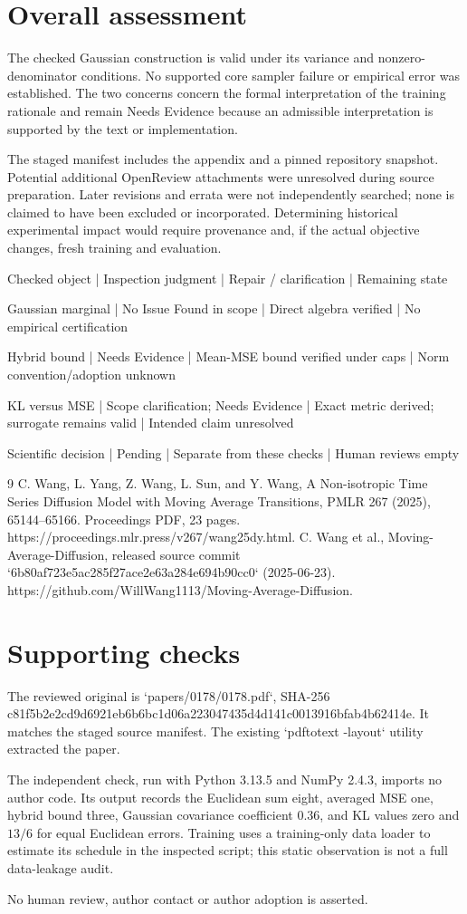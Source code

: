 \documentclass[10pt]{article}
\begin{document}
\section*{Overall assessment}
The checked Gaussian construction is valid under its variance and nonzero-denominator conditions. No supported core sampler failure or empirical error was established. The two concerns concern the formal interpretation of the training rationale and remain Needs Evidence because an admissible interpretation is supported by the text or implementation.\par
The staged manifest includes the appendix and a pinned repository snapshot. Potential additional OpenReview attachments were unresolved during source preparation. Later revisions and errata were not independently searched; none is claimed to have been excluded or incorporated. Determining historical experimental impact would require provenance and, if the actual objective changes, fresh training and evaluation.\par
Checked object | Inspection judgment | Repair / clarification | Remaining state\par
Gaussian marginal | No Issue Found in scope | Direct algebra verified | No empirical certification\par
Hybrid bound | Needs Evidence | Mean-MSE bound verified under caps | Norm convention/adoption unknown\par
KL versus MSE | Scope clarification; Needs Evidence | Exact metric derived; surrogate remains valid | Intended claim unresolved\par
Scientific decision | Pending | Separate from these checks | Human reviews empty\par
9 C. Wang, L. Yang, Z. Wang, L. Sun, and Y. Wang, A Non-isotropic Time Series Diffusion Model with Moving Average Transitions, PMLR 267 (2025), 65144–65166. Proceedings PDF, 23 pages. https://proceedings.mlr.press/v267/wang25dy.html. C. Wang et al., Moving-Average-Diffusion, released source commit `6b80af723e5ac285f27ace2e63a284e694b90cc0` (2025-06-23). https://github.com/WillWang1113/Moving-Average-Diffusion.\par
\section*{Supporting checks}
The reviewed original is `papers/0178/0178.pdf`, SHA-256 c81f5b2e2cd9d6921eb6b6bc1d06a223047435d4d141c0013916bfab4b62414e. It matches the staged source manifest. The existing `pdftotext -layout` utility extracted the paper.\par
The independent check, run with Python 3.13.5 and NumPy 2.4.3, imports no author code. Its output records the Euclidean sum eight, averaged MSE one, hybrid bound three, Gaussian covariance coefficient \(0.36\), and KL values zero and \(13/6\) for equal Euclidean errors. Training uses a training-only data loader to estimate its schedule in the inspected script; this static observation is not a full data-leakage audit.\par
No human review, author contact or author adoption is asserted.\par
\end{document}
